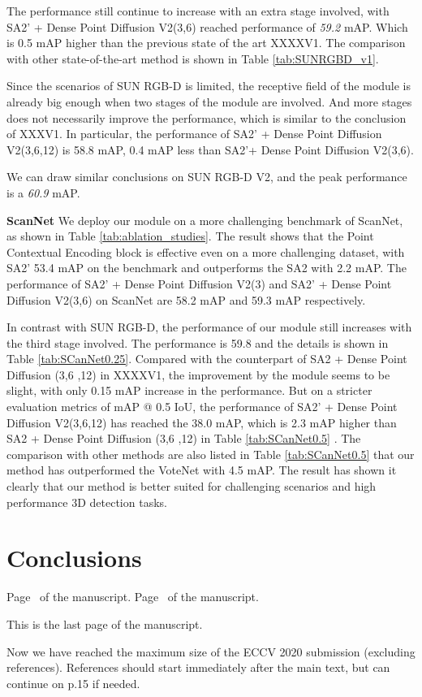 \documentclass[runningheads]{llncs}
\begin{document}
The performance still continue to increase with an extra stage involved, with SA2' + Dense Point Diffusion V2(3,6) reached performance of \emph{59.2} mAP. Which is 0.5 mAP higher than the previous state of the art XXXXV1. The comparison with other state-of-the-art method is shown in Table \ref{tab:SUNRGBD_v1}.

Since the scenarios of SUN RGB-D is limited, the receptive field of the module is already big enough when two stages of the module are involved. And more stages does not necessarily  improve the performance, which is similar to the conclusion of XXXV1.  In particular, the performance of SA2' + Dense Point Diffusion V2(3,6,12) is 58.8 mAP, 0.4 mAP less than SA2'+ Dense Point Diffusion V2(3,6).

We can draw similar conclusions on SUN RGB-D V2, and the peak performance is a \emph{60.9} mAP.



\noindent\textbf{ScanNet}  
We deploy our module on a more challenging benchmark of ScanNet, as shown in Table \ref{tab:ablation_studies}. The result shows that the Point Contextual Encoding block is effective even on a more challenging dataset, with SA2' 53.4 mAP on the benchmark and outperforms the SA2 with  2.2 mAP.
The performance of SA2' + Dense Point Diffusion V2(3) and SA2' + Dense Point Diffusion V2(3,6) on ScanNet are 58.2 mAP and 59.3 mAP respectively.

In contrast with SUN RGB-D, the performance of our module still increases with the third stage involved. The performance is 59.8 and the details is shown in Table \ref{tab:SCanNet0.25}. Compared with the counterpart of SA2 + Dense Point Diffusion (3,6 ,12) in XXXXV1, the improvement by the module seems to be slight, with only 0.15 mAP increase in the performance. But on a stricter evaluation metrics of mAP @ 0.5 IoU, the performance of SA2' + Dense Point Diffusion V2(3,6,12)  has reached the 38.0 mAP, which is 2.3 mAP higher than SA2 + Dense Point Diffusion (3,6 ,12) in Table \ref{tab:SCanNet0.5} . The comparison with other methods are also listed in Table \ref{tab:SCanNet0.5} that our method has outperformed the VoteNet \cite{VoteNet} with 4.5 mAP. The result has shown it clearly that our method is better suited for challenging scenarios and high performance 3D detection tasks.
\section{Conclusions}



\clearpage\mbox{}Page \thepage\ of the manuscript.
\clearpage\mbox{}Page \thepage\ of the manuscript.

This is the last page of the manuscript.
\par\vfill\par
Now we have reached the maximum size of the ECCV 2020 submission (excluding references).
References should start immediately after the main text, but can continue on p.15 if needed.

\clearpage
%
%


\end{document}

